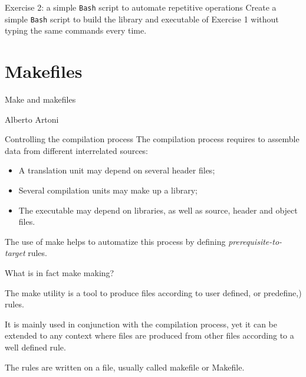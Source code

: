 \documentclass[10pt,aspectratio=169]{beamer}
\newcommand{\blue}{\color{blue}}
\begin{document}
\begin{frame}{Exercise 2: a simple \texttt{Bash} script to automate repetitive operations}
  Create a simple \texttt{Bash} script to build the library and executable of Exercise 1 without typing the same commands every time.
\end{frame}

\section*{Makefiles}

\begin{frame}
\centering
{ \huge Make and makefiles}\\

\vspace{1cm}

\large Alberto Artoni
\end{frame}

\begin{frame}{Controlling the compilation process}
The compilation process requires to assemble data from different interrelated sources:
\smallskip

\begin{itemize}
\item A translation unit may depend on several header files; 
\item Several compilation units may make up a library;
\item The executable may depend on libraries, as well as source, header and object files.
\end{itemize}

The use of \alert{make} helps to automatize this process by defining
\emph{prerequisite-to-target} rules.
\end{frame}


\begin{frame}{What is in fact make making?}

  The \alert{make} utility is a tool to produce files according to user
  defined, or predefine,) rules.  \medskip

  It is mainly used in conjunction with the \alert{compilation process},
  yet it can be extended to any context where files are produced from
  other files according to a well defined rule.  \medskip

  The rules are written on a file, usually called {\blue makefile} or
  {\blue Makefile}.  
\end{frame}
\end{document}
